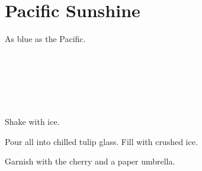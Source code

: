 \section[Pacific Sushine]{Pacific Sunshine}

\begin{recipestats}[
        servings=1,
        preptime=5 \minute,
        source=Mike \& Jane,
        original=\citefield{mrBoston2006}{shorttitle}~\cite{mrBoston2006},
    ]
\end{recipestats}

\begin{recipeabstract}
    As blue as the Pacific.
\end{recipeabstract}

\begin{ingredientcolumns}
    \begin{ingredientblock}
        \\
        \\
    \end{ingredientblock}

    \begin{ingredientblock}
        \\
        \\
    \end{ingredientblock}
\end{ingredientcolumns}

\begin{preparation}
\item Shake with ice.

\item Pour all into chilled tulip glass.
    Fill with crushed ice.

\item Garnish with the cherry and a paper umbrella.
\end{preparation}

\recipeend%
